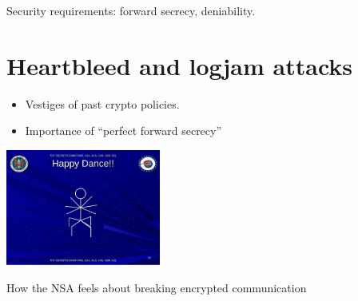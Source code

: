 Security requirements: forward secrecy, deniability.

\section{Heartbleed and logjam attacks}\label{Heartbleed-and-logjam-att}

\begin{itemize}
\item
  Vestiges of past crypto policies.
\item
  Importance of ``perfect forward secrecy''
\end{itemize}


\begin{marginfigure}
\centering
\includegraphics[width=\linewidth, height=1.5in, keepaspectratio]{../figure/NSA_Page_29.jpg}
\caption{How the NSA feels about breaking encrypted communication}
\label{tmplabelfig}
\end{marginfigure}


